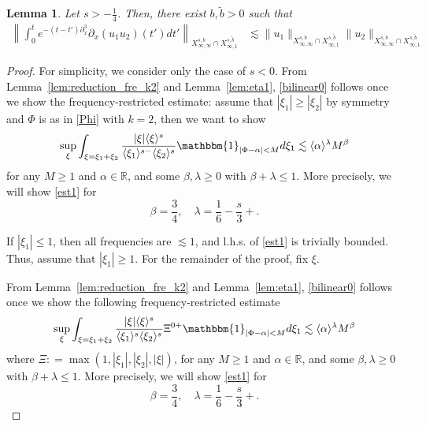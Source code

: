 \documentclass[%
11pt,  reqno]{amsart}
\newcommand{\fia}{\mathbbm{1}_{|\Phi-\alpha|<M}}
\newcommand{\jap}[1]{\langle #1 \rangle}
\newcommand{\5}{\textup{V}}
\newcommand{\les}{\lesssim}
\newcommand{\wt}{\widetilde}
\newtheorem{lemma}[theorem]{Lemma}
\theoremstyle{remark}
\newcommand{\R}{\mathbb{R}}
\newcommand{\al}{\alpha}
\newcommand{\be}{\beta}
\newcommand{\ld}{\lambda}
\numberwithin{equation}{section}
\numberwithin{theorem}{section}
\begin{document}
\begin{lemma}\label{LEM:bil0}
Let $s>-\frac14$. Then, there exist $b,\wt b >0 $ 
 such that 
\begin{align}
\label{bilinear0}
\left\|\int_0^te^{-(t-t')\partial_x^3}\partial_x(u_1u_2) (t')dt' \right\|_{X^{s,b}_{\infty, \infty}\cap X^{s,\tilde{b}}_{\infty, 1} } & \les 
\|u_1\|_{X^{s,b}_{\infty, \infty}\cap X^{s,\tilde{b}}_{\infty, 1} }
\|u_2\|_{X^{s,b}_{\infty, \infty}\cap X^{s,\tilde{b}}_{\infty, 1} }
\end{align}
\end{lemma}



\begin{proof}%


For simplicity, we consider only the case of $s<0$.
From Lemma~\ref{lem:reduction_fre_k2} and Lemma~\ref{lem:eta1}, \eqref{bilinear0} follows once we show the frequency-restricted estimate: assume that $|\xi_1| \ge |\xi_2|$ by symmetry and $\Phi$ is as in \eqref{Phi} with $k=2$, then we want to show
\begin{equation}
\label{est1}
\sup_{\xi} \int_{\xi=\xi_1+\xi_2}
\frac{|\xi|\jap{\xi}^s}{\jap{\xi_1}^{s-}\jap{\xi_2}^s}
\fia d\xi_1
\lesssim 
\jap{\al}^{\ld } M^{\be} 
\end{equation}
for any $M\ge 1$ and $\al\in\R$, and some $\be,\ld \ge 0$ with $\be+\ld \le 1$. More precisely, we will show \eqref{est1} for
$$
\beta=\frac34,\quad \lambda=\frac{1}{6}-\frac s3+. 
$$


If $|\xi_1| \le 1$, then all frequencies are $\les1$, and l.h.s. of \eqref{est1} is trivially bounded. Thus, assume that $|\xi_1| \ge 1$. 
For the remainder of the proof, fix $\xi$. 




From Lemma~\ref{lem:reduction_fre_k2} and Lemma~\ref{lem:eta1}, \eqref{bilinear0} follows once we show the following frequency-restricted estimate
\begin{equation}
\label{est1}
\sup_{\xi} \int_{\xi=\xi_1+\xi_2}
\frac{|\xi|\jap{\xi}^s}{\jap{\xi_1}^s\jap{\xi_2}^s}
\Xi^{0+}
\fia d\xi_1
\lesssim 
\jap{\al}^{\ld } M^{\be} 
\end{equation}
where $\Xi : = \max(1, |\xi_1|, |\xi_2|, |\xi|)$, 
for any $M\ge 1$ and $\al\in\R$, and some $\be,\ld \ge 0$ with $\be+\ld \le 1$. More precisely, we will show \eqref{est1} for
$$
\beta=\frac34,\quad \lambda=\frac{1}{6}-\frac s3+. 
$$



\end{proof}
\end{document}
